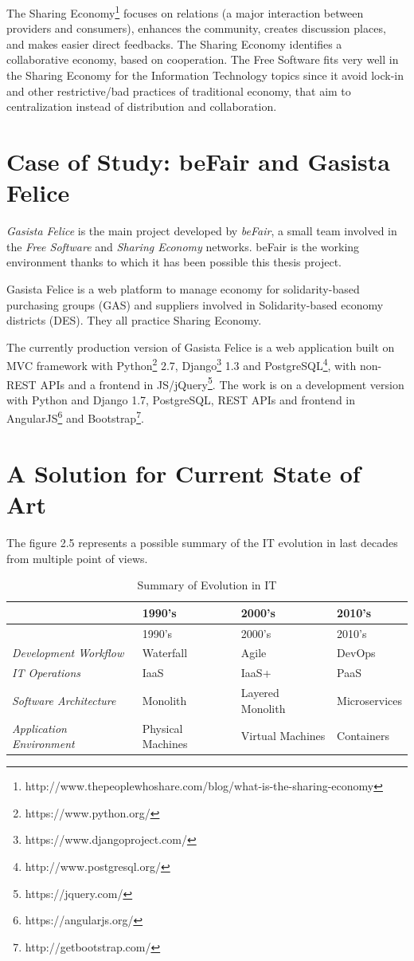 The Sharing Economy\footnote{http://www.thepeoplewhoshare.com/blog/what-is-the-sharing-economy} focuses on relations (a major interaction between providers and consumers), enhances the community, creates discussion places, and makes easier direct feedbacks. The Sharing Economy identifies a collaborative economy, based on cooperation. The Free Software fits very well in the Sharing Economy for the Information
Technology topics since it avoid lock-in and other restrictive/bad practices of traditional economy, that aim to centralization instead of distribution and collaboration.

\section{Case of Study: beFair and Gasista
Felice}\label{case-of-study-befair-and-gasista-felice}

\textit{Gasista Felice} is the main project developed by \textit{beFair}, a
small team involved in the \textit{Free Software} and \textit{Sharing
Economy} networks. beFair is the working environment thanks to which it
has been possible this thesis project.

Gasista Felice is a web platform to manage economy for solidarity-based
purchasing groups (GAS) and suppliers involved in Solidarity-based
economy districts (DES). They all practice Sharing Economy.

The currently production version of Gasista Felice is a web application
built on MVC framework with Python\footnote{https://www.python.org/} 2.7, Django\footnote{https://www.djangoproject.com/} 1.3 and PostgreSQL\footnote{http://www.postgresql.org/}, with
non-REST APIs and a frontend in JS/jQuery\footnote{https://jquery.com/}. The work is on a development
version with Python and Django 1.7, PostgreSQL, REST APIs and frontend
in AngularJS\footnote{https://angularjs.org/} and Bootstrap\footnote{http://getbootstrap.com/}.

\section{A Solution for Current State of
Art}\label{a-solution-for-current-state-of-art}

The figure 2.5 represents a possible summary of the IT evolution in last decades from multiple point of views.

\begin{longtable}[c]{@{}llll@{}}
\caption{Summary of Evolution in IT}\tabularnewline
\toprule
& 1990's & 2000's & 2010's\tabularnewline
\midrule
\endfirsthead
\toprule
& 1990's & 2000's & 2010's\tabularnewline
\midrule
\endhead
\textit{Development Workflow} & Waterfall & Agile & DevOps\tabularnewline
\textit{IT Operations} & IaaS & IaaS+ & PaaS\tabularnewline
\textit{Software Architecture} & Monolith & Layered Monolith &
Microservices\tabularnewline
\textit{Application Environment} & Physical Machines & Virtual Machines &
Containers\tabularnewline
\bottomrule
\end{longtable}

